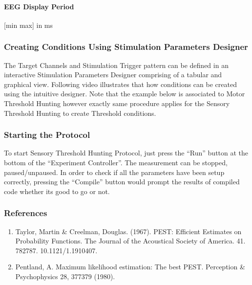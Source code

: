 \documentclass[letterpaper,10pt,english]{sphinxmanual}
\begin{document}
\paragraph{EEG Display Period}
\label{\detokenize{15_SensoryThresholdHunting:eeg-display-period}}
\sphinxAtStartPar
{[}min max{]} in ms


\subsubsection{Creating Conditions Using Stimulation Parameters Designer}
\label{\detokenize{15_SensoryThresholdHunting:creating-conditions-using-stimulation-parameters-designer}}
\sphinxAtStartPar
The Target Channels and Stimulation Trigger pattern can be defined in an interactive Stimulation Parameters Designer comprising of a tabular and graphical view. Following video illustrates that how conditions can be created using the intuitive designer. Note that the example below is associated to Motor Threshold Hunting however exactly same procedure applies for the Sensory Threshold Hunting to create Threshold conditions.


\subsubsection{Starting the Protocol}
\label{\detokenize{15_SensoryThresholdHunting:starting-the-protocol}}
\sphinxAtStartPar
To start Sensory Threshold Hunting Protocol, just press the “Run” button at the bottom of the “Experiment Controller”. The measurement can be stopped, paused/unpaused. In order to check if all the parameters have been setup correctly, pressing the “Compile” button would prompt the results of compiled code whether its good to go or not.


\subsubsection{References}
\label{\detokenize{15_SensoryThresholdHunting:references}}\begin{enumerate}
%
\item {} 
\sphinxAtStartPar
Taylor, Martin \& Creelman, Douglas. (1967). PEST: Efficient Estimates on Probability Functions. The Journal of the Acoustical Society of America. 41. 782\sphinxhyphen{}787. 10.1121/1.1910407.

\item {} 
\sphinxAtStartPar
Pentland, A. Maximum likelihood estimation: The best PEST. Perception \& Psychophysics 28, 377\textendash{}379 (1980). 

\end{enumerate}
\end{document}
